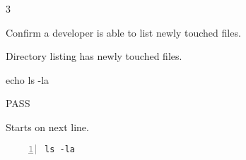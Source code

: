 \begin{description}[align=right,leftmargin=3.2cm,labelindent=3.0cm]
\item[Step:] 3
\item[Confirm:] Confirm a developer is able to list newly touched files.
\item[Expectation:] Directory listing has newly touched files.
\item[Command:] echo ls  -la
\item[Test Result:] PASS
\item[Evidence:] Starts on next line.
\end{description}
\begin{lstlisting}[numbers=left]
ls -la

\end{lstlisting}
